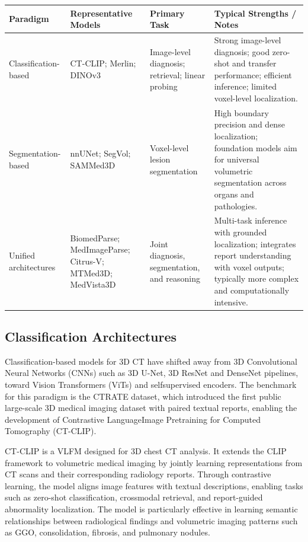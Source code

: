 \begin{center}
\label{tab:3dctparadigms}
\begin{tabularx}{\textwidth}{p{2.8cm} >{\raggedright\arraybackslash}X >{\raggedright\arraybackslash}X >{\raggedright\arraybackslash}X}
\toprule
\textbf{Paradigm} & \textbf{Representative Models} & \textbf{Primary Task} & \textbf{Typical Strengths / Notes} \\
\midrule
Classification-based & CT-CLIP; Merlin; DINOv3 & Image-level diagnosis; retrieval; linear probing & Strong image-level diagnosis; good zero-shot and transfer performance; efficient inference; limited voxel-level localization. \\
\addlinespace
Segmentation-based & nnUNet; SegVol; SAMMed3D & Voxel-level lesion segmentation & High boundary precision and dense localization; foundation models aim for universal volumetric segmentation across organs and pathologies. \\
\addlinespace
Unified architectures & BiomedParse; MedImageParse; Citrus-V; MTMed3D; MedVista3D & Joint diagnosis, segmentation, and reasoning & Multi-task inference with grounded localization; integrates report understanding with voxel outputs; typically more complex and computationally intensive. \\
\midrule
\end{tabularx}
\end{center}

\subsection{Classification Architectures}
Classification-based models for 3D CT have shifted away from 3D Convolutional Neural Networks (CNNs) such as 3D U-Net,
3D ResNet and DenseNet pipelines, toward Vision Transformers (ViTs) and selfsupervised encoders. The benchmark for this paradigm is
the CTRATE dataset, which introduced the first public large-scale 3D medical imaging dataset with paired textual reports, enabling
the development of Contrastive LanguageImage Pretraining for Computed Tomography (CT-CLIP).

CT-CLIP is a VLFM designed for 3D chest CT analysis. It extends the CLIP framework to volumetric medical
imaging by jointly learning representations from CT scans and their corresponding radiology reports. \cite{hamamci2024ctclip,radford2021clip}
Through contrastive learning, the model aligns image features with textual descriptions, enabling tasks such as zero-shot classification,
crossmodal retrieval, and report-guided abnormality localization. \cite{hamamci2024ctclip}
The model is particularly effective in learning semantic relationships between radiological findings and volumetric imaging
patterns such as GGO, consolidation, fibrosis, and pulmonary nodules. \cite{hamamci2024ctclip,rexgroundingct}

